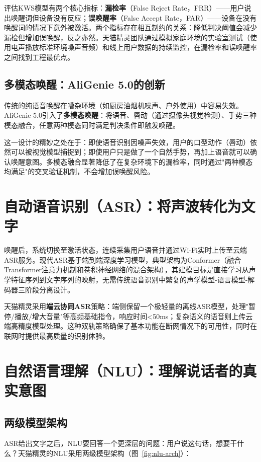 \documentclass[12pt, a4paper, twoside, openright]{book}
\begin{document}
评估KWS模型有两个核心指标：\textbf{漏检率}（False Reject Rate，FRR）——用户说出唤醒词但设备没有反应；\textbf{误唤醒率}（False Accept Rate，FAR）——设备在没有唤醒词的情况下意外被激活。两个指标存在相互制约的关系：降低判决阈值会减少漏检但增加误唤醒，反之亦然。天猫精灵团队通过模拟家庭环境的实验室测试（使用电声播放标准环境噪声音频）和线上用户数据的持续监控，在漏检率和误唤醒率之间找到工程最优点。

\subsection{多模态唤醒：AliGenie 5.0的创新}

传统的纯语音唤醒在嘈杂环境（如厨房油烟机噪声、户外使用）中容易失效。AliGenie 5.0引入了\textbf{多模态唤醒}：将语音、唇动（通过摄像头视觉检测）、手势三种模态融合，任意两种模态同时满足判决条件即触发唤醒。

这一设计的精妙之处在于：即使语音识别因噪声失效，用户的口型动作（唇动）依然可以被视觉模型捕捉到；即使用户只是做了一个自然手势，再加上语音就可以确认唤醒意图。多模态融合显著降低了在复杂环境下的漏检率，同时通过"两种模态均满足"的交叉验证机制，不会增加误唤醒风险。

\section{自动语音识别（ASR）：将声波转化为文字}

唤醒后，系统切换至激活状态，连续采集用户语音并通过Wi-Fi实时上传至云端ASR服务。现代ASR基于端到端深度学习模型，典型架构为Conformer（融合Transformer注意力机制和卷积神经网络的混合架构），其建模目标是直接学习从声学特征序列到文字序列的映射，无需传统语音识别中繁复的声学模型-语言模型-解码器三阶段分离设计。

天猫精灵采用\textbf{端云协同ASR}策略：端侧保留一个极轻量的离线ASR模型，处理"暂停/播放/增大音量"等高频基础指令，响应时间<50ms；复杂语义的语音则上传云端高精度模型处理。这种双轨策略确保了基本功能在断网情况下的可用性，同时在联网时提供最高质量的识别体验。

\section{自然语言理解（NLU）：理解说话者的真实意图}

\subsection{两级模型架构}

ASR给出文字之后，NLU要回答一个更深层的问题：用户说这句话，想要干什么？天猫精灵的NLU采用两级模型架构（图~\ref{fig:nlu-arch}）：
\end{document}
